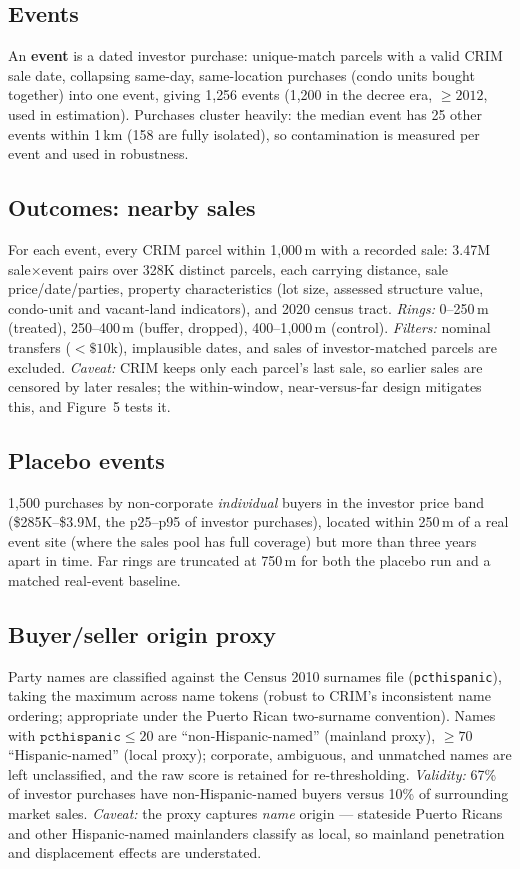 \documentclass[11pt]{article}
\newcommand{\pcth}{\texttt{pcthispanic}}
\begin{document}
\subsection{Events}

An \textbf{event} is a dated investor purchase: unique-match parcels with a
valid CRIM sale date, collapsing same-day, same-location purchases (condo units
bought together) into one event, giving 1{,}256 events (1{,}200 in the decree
era, $\geq 2012$, used in estimation). Purchases cluster heavily: the median
event has 25 other events within 1\,km (158 are fully isolated), so
contamination is measured per event and used in robustness.

\subsection{Outcomes: nearby sales}

For each event, every CRIM parcel within 1{,}000\,m with a recorded sale:
3.47M sale$\times$event pairs over 328K distinct parcels, each carrying
distance, sale price/date/parties, property characteristics (lot size, assessed
structure value, condo-unit and vacant-land indicators), and 2020 census tract.
\emph{Rings:} 0--250\,m (treated), 250--400\,m (buffer, dropped), 400--1{,}000\,m
(control). \emph{Filters:} nominal transfers ($<\$10$k), implausible dates, and
sales of investor-matched parcels are excluded. \emph{Caveat:} CRIM keeps only
each parcel's last sale, so earlier sales are censored by later resales; the
within-window, near-versus-far design mitigates this, and Figure~5 tests it.

\subsection{Placebo events}

1{,}500 purchases by non-corporate \emph{individual} buyers in the investor
price band (\$285K--\$3.9M, the p25--p95 of investor purchases), located within
250\,m of a real event site (where the sales pool has full coverage) but more
than three years apart in time. Far rings are truncated at 750\,m for both the
placebo run and a matched real-event baseline.

\subsection{Buyer/seller origin proxy}

Party names are classified against the Census 2010 surnames file (\pcth),
taking the maximum across name tokens (robust to CRIM's inconsistent name
ordering; appropriate under the Puerto Rican two-surname convention). Names
with $\pcth \leq 20$ are ``non-Hispanic-named'' (mainland proxy), $\geq 70$
``Hispanic-named'' (local proxy); corporate, ambiguous, and unmatched names are
left unclassified, and the raw score is retained for re-thresholding.
\emph{Validity:} 67\% of investor purchases have non-Hispanic-named buyers
versus 10\% of surrounding market sales. \emph{Caveat:} the proxy captures
\emph{name} origin --- stateside Puerto Ricans and other Hispanic-named
mainlanders classify as local, so mainland penetration and displacement effects
are understated.
\end{document}
